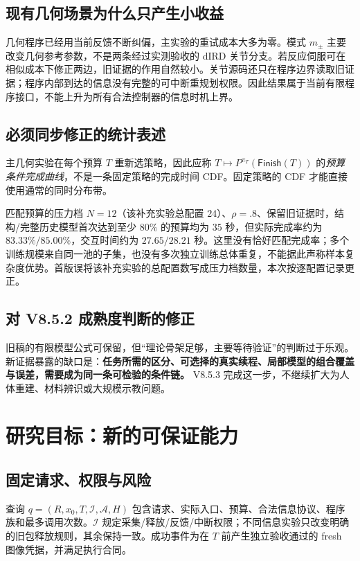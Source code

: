 \documentclass[11pt,a4paper,fontset=fandol]{ctexart}
\theoremstyle{definition}
\theoremstyle{remark}\newtheorem{remark}[theorem]{说明}
\numberwithin{equation}{section}
\newcommand{\Finish}{\mathsf{Finish}}\newcommand{\Win}{\mathsf{Win}}
\begin{document}
\subsection{现有几何场景为什么只产生小收益}
几何程序已经用当前反馈不断纠偏，主实验的重试成本大多为零。模式 $m_\pm$ 主要改变几何参考参数，不是两条经过实测验收的 dIRD 关节分支。若反应伺服可在相似成本下修正两边，旧证据的作用自然较小。关节源码还只在程序边界读取旧证据；程序内部到达的信息没有完整的可中断重规划权限。因此结果属于当前有限程序接口，不能上升为所有合法控制器的信息时机上界\cite{corecode,jointcode}。

\subsection{必须同步修正的统计表述}
主几何实验在每个预算 $T$ 重新选策略，因此应称
$T\mapsto P^{\pi_T}(\Finish(T))$ 的\emph{预算条件完成曲线}，不是一条固定策略的完成时间 CDF。固定策略的 CDF 才能直接使用通常的同时分布带。

匹配预算的压力档 $N=12$（该补充实验总配置 $24$）、$\rho=.8$、保留旧证据时，结构/完整历史模型首次达到至少 $80\%$ 的预算均为 $35$ 秒，但实际完成率约为 $83.33\%/85.00\%$，交互时间约为 $27.65/28.21$ 秒。这里没有恰好匹配完成率；多个训练规模来自同一池的子集，也没有多次独立训练总体重复，不能据此声称样本复杂度优势\cite{budgetdata}。首版误将该补充实验的总配置数写成压力档数量，本次按逐配置记录更正。

\subsection{对 V8.5.2 成熟度判断的修正}
旧稿的有限模型公式可保留，但“理论骨架足够，主要等待验证”的判断过于乐观。新证据暴露的缺口是：\textbf{任务所需的区分、可选择的真实续程、局部模型的组合覆盖与误差，需要成为同一条可检验的条件链。} V8.5.3 完成这一步，不继续扩大为人体重建、材料辨识或大规模示教问题。

\section{研究目标：新的可保证能力}
\label{sec:goal}
\subsection{固定请求、权限与风险}
查询 $q=(R,x_0,T,\mathcal I,\mathcal A,H)$ 包含请求、实际入口、预算、合法信息协议、程序族和最多调用次数。$\mathcal I$ 规定采集/释放/反馈/中断权限；不同信息实验只改变明确的旧包释放规则，其余保持一致。成功事件为在 $T$ 前产生独立验收通过的 fresh 图像凭据，并满足执行合同。
\end{document}
